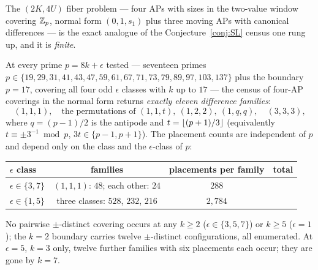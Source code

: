 The $(2K,4U)$ fiber problem --- four APs with sizes in the two-value
window covering $\mathbb{Z}_p$, normal form $(0,1,s_1)$ plus three moving APs
with canonical differences --- is the exact analogue of the
Conjecture~\ref{conj:SL} census one rung up, and it is \emph{finite}.

\begin{proposition}
\label{prop:T8census}
At every prime $p=8k+\epsilon$ tested --- seventeen primes
$p\in\{19,29,31,41,43,47,59,61,67,71,73,79,89,97,103,137\}$ plus the
boundary $p=17$, covering all four odd $\epsilon$ classes with $k$ up to
$17$ --- the census of four-AP coverings in the normal form returns
\emph{exactly eleven difference families}:
\[
(1,1,1),\quad\text{the permutations of }(1,1,t),\ (1,2,2),\ (1,q,q),
\quad(3,3,3),
\]
where $q=(p-1)/2$ is the antipode and $t=\left\lfloor (p+1)/3 \right\rfloor$ (equivalently
$t\equiv\pm3^{-1}\bmod p$, $3t\in\{p-1,p+1\}$). The placement counts are
independent of $p$ and depend only on the class and the $\epsilon$-class
of $p$:
\begin{center}
\small
\begin{tabular}{@{}lccc@{}}
\toprule
$\epsilon$ class & families & placements per family & total \\
\midrule
$\epsilon\in\{3,7\}$ & $(1,1,1)$: $48$; each other: $24$ & $288$ \\
$\epsilon\in\{1,5\}$ & three classes: $528$, $232$, $216$ & $2{,}784$ \\
\bottomrule
\end{tabular}
\end{center}
\noindent No pairwise $\pm$-distinct covering occurs at any $k\ge2$
($\epsilon\in\{3,5,7\}$) or $k\ge5$ ($\epsilon=1$); the $k=2$ boundary
carries twelve $\pm$-distinct configurations, all enumerated. At
$\epsilon=5$, $k=3$ only, twelve further families with six placements
each occur; they are gone by $k=7$.
\end{proposition}

